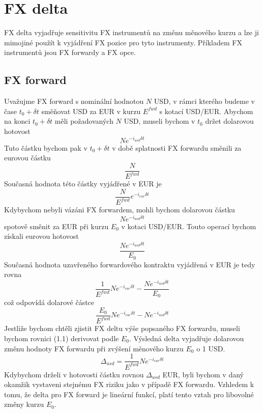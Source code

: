 \documentclass[a4paper]{book}
\begin{document}
\chapter{FX delta}

FX delta vyjadřuje sensitivitu FX instrumentů na změnu měnového kurzu a lze ji mimojiné použít k vyjádření FX pozice pro tyto instrumenty. Příkladem FX instrumentů jsou FX forwardy a FX opce.

\section{FX forward}

Uvažujme FX forward s nominální hodnotou $N$ USD, v rámci kterého budeme v čase $t_0 + \delta t$ směňovat USD za EUR v kurzu $E^{fwd}$ s kotací USD/EUR. Abychom na konci $t_0 + \delta t$ měli požadovaných $N$ USD, museli bychom v $t_0$ držet dolarovou hotovost
\begin{equation*}
N e^{-i_{usd} \delta t}
\end{equation*}
Tuto částku bychom pak v $t_0 + \delta t$ v době splatnosti FX forwardu směnili za eurovou částku
\begin{equation*}
\frac{N}{E^{fwd}}
\end{equation*}
Současná hodnota této částky vyjádřené v EUR je
\begin{equation*}
\frac{N}{E^{fwd}} e^{-i_{eur} \delta t}
\end{equation*}
Kdybychom nebyli vázáni FX forwardem, mohli bychom dolarovou částku
\begin{equation*}
N e^{-i_{usd} \delta t}
\end{equation*}
spotově směnit za EUR při kurzu $E_0$ v kotaci USD/EUR. Touto operací bychom získali eurovou hotovost
\begin{equation*}
\frac{N e^{-i_{usd} \delta t}}{E_0}
\end{equation*}
Současná hodnota uzavřeného forwardového kontraktu vyjádřená v EUR je tedy rovna
\begin{equation*}
\frac{1}{E^{fwd}} N e^{-i_{eur} \delta t} - \frac{N e^{-i_{usd} \delta t}}{E_0}
\end{equation*}
což odpovídá dolarové částce
\begin{equation*}
\frac{E_0}{E^{fwd}} N e^{-i_{eur} \delta t} - N e^{-i_{usd} \delta t}
\end{equation*}
Jestliže bychom chtěli zjistit FX deltu výše popsaného FX forwardu, museli bychom rovnici (1.1) derivovat podle $E_0$. Výsledná delta vyjadřuje dolarovou změnu hodnoty FX forwardu při zvýšení měnového kurzu $E_0$ o 1 USD.
\begin{equation*}
\Delta_{usd} = \frac{1}{E^{fwd}} N e^{-i_{eur} \delta t}
\end{equation*}
Kdybychom drželi v hotovosti částku rovnou $\Delta_{usd}$ EUR, byli bychom v daný okamžik vystaveni stejnému FX riziku jako v případě FX forwardu. Vzhledem k tomu, že delta pro FX forward je lineární funkcí, platí tento vztah pro libovolné změny kurzu $E_0$.
\end{document}
